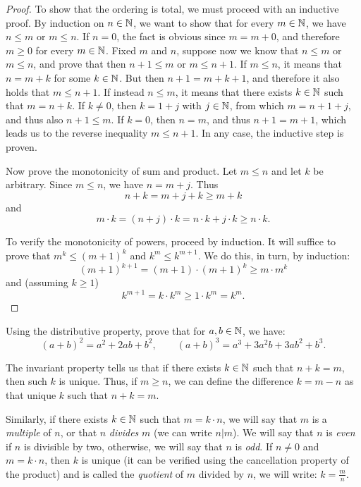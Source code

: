 \begin{proof}
To show that the ordering is total, we must proceed with an inductive proof. 
By induction on $n\in {\mathbb N}$, we want to show 
that for every $m\in {\mathbb N}$, we have $n\le m$ or $m\le n$. 
If $n=0$, the fact is obvious since $m=m+0$, and therefore $m\ge 0$
for every $m\in {\mathbb N}$.
Fixed $m$ and $n$, suppose now we know that $n\le m$ or $m\le n$,
and prove that then $n+1\le m$ or $m\le n+1$.
If $m\le n$, it means that $n = m + k$ for some 
$k\in {\mathbb N}$. But then $n+1 = m + k + 1$, and therefore 
it also holds that $m\le n+1$. 
If instead $n\le m$, it means that there exists $k\in {\mathbb N}$ 
such that $m=n+k$. If $k\neq 0$, then $k=1+j$ with $j\in {\mathbb N}$,
from which $m=n+1+j$, and thus also $n+1\le m$.
If $k=0$, then $n=m$, and thus $n+1=m+1$, which leads us 
to the reverse inequality $m \le n+1$.
In any case, the inductive step is proven.

Now prove the monotonicity of sum and product.
Let $m\le n$ and let $k$ be arbitrary.
Since $m\le n$, we have $n=m+j$. 
Thus
\[
n+k = m + j + k \ge m+k   
\] 
and
\[
m\cdot k = (n+j)\cdot k = n\cdot k + j\cdot k \ge n\cdot k.  
\]

To verify the monotonicity of powers, proceed by induction.
It will suffice to prove that $m^k\le(m+1)^k$ and $k^m\le k^{m+1}$.
We do this, in turn, by induction:
\[
(m+1)^{k+1} = (m+1)\cdot (m+1)^k \ge m\cdot m^k
\]
and (assuming $k\ge 1$)
\[
k^{m+1} = k\cdot k^m \ge 1\cdot k^m = k^m. 
\]
\end{proof}

\begin{exercise}
Using the distributive property, prove that for $a,b\in {\mathbb N}$, we have:
\[
(a+b)^2 = a^2+2ab+b^2,
\qquad
(a+b)^3 = a^3 + 3a^2b + 3ab^2 + b^3.
\]
\end{exercise}

The invariant property tells us 
that if there exists $k\in {\mathbb N}$ such that $n+k=m$,
then such $k$ is unique. 
%
%
Thus, if $m\ge n$, we can define the difference $k=m-n$
as that unique $k$ such that $n+k=m$.

Similarly, if there exists $k\in {\mathbb N}$ such that $m=k\cdot n$,
we will say that $m$ is a \emph{multiple} of $n$, 
%
%
or that $n$ \emph{divides} $m$ (we can write $n\vert m$).
We will say that $n$ is \emph{even} if $n$ is divisible by two,
otherwise, we will say that $n$ is \emph{odd}.
If $n\neq 0$ and $m=k\cdot n$, then $k$ is unique 
(it can be verified using the cancellation property of the product)
and is called the \emph{quotient} of $m$ divided by $n$, 
%
we will write: $k=\frac m n$.

